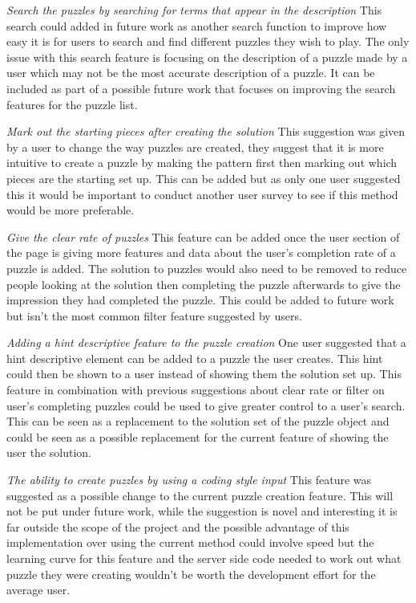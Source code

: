 \documentclass{l4proj}
\begin{document}
\emph{Search the puzzles by searching for terms that appear in the description}
This search could added in future work as another search function to improve how easy it is for users to search and find different puzzles they wish to play. The only issue with this search feature is focusing on the description of a puzzle made by a user which may not be the most accurate description of a puzzle. It can be included as part of a possible future work that focuses on improving the search features for the puzzle list.

\emph{Mark out the starting pieces after creating the solution}
This suggestion was given by a user to change the way puzzles are created, they suggest that it is more intuitive to create a puzzle by making the pattern first then marking out which pieces are the starting set up. This can be added but as only one user suggested this it would be important to conduct another user survey to see if this method would be more preferable.

\emph{Give the clear rate of puzzles}
This feature can be added once the user section of the page is giving more features and data about the user's completion rate of a puzzle is added. The solution to puzzles would also need to be removed to reduce people looking at the solution then completing the puzzle afterwards to give the impression they had completed the puzzle. This could be added to future work but isn't the most common filter feature suggested by users.

\emph{Adding a hint descriptive feature to the puzzle creation}
One user suggested that a hint descriptive element can be added to a puzzle the user creates. This hint could then be shown to a user instead of showing them the solution set up. This feature in combination with previous suggestions about clear rate or filter on user's completing puzzles could be used to give greater control to a user's search. This can be seen as a replacement to the solution set of the puzzle object and could be seen as a possible replacement for the current feature of showing the user the solution.

\emph{The ability to create puzzles by using a coding style input}
This feature was suggested as a possible change to the current puzzle creation feature. This will not be put under future work, while the suggestion is novel and interesting it is far outside the scope of the project and the possible advantage of this implementation over using the current method could involve speed but the learning curve for this feature and the server side code needed to work out what puzzle they were creating wouldn't be worth the development effort for the average user.
\end{document}
